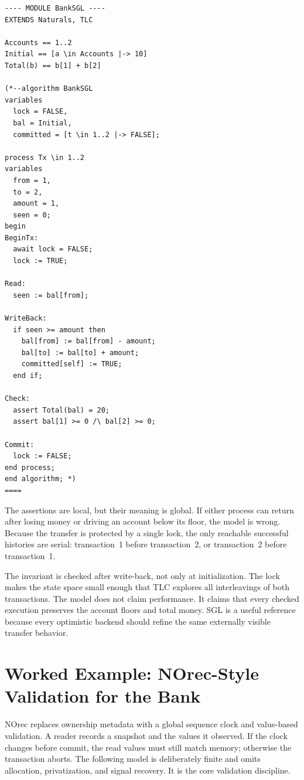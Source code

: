 \begin{lstlisting}[caption={A complete PlusCal model of the bank transfer under SGL.}]
---- MODULE BankSGL ----
EXTENDS Naturals, TLC

Accounts == 1..2
Initial == [a \in Accounts |-> 10]
Total(b) == b[1] + b[2]

(*--algorithm BankSGL
variables
  lock = FALSE,
  bal = Initial,
  committed = [t \in 1..2 |-> FALSE];

process Tx \in 1..2
variables
  from = 1,
  to = 2,
  amount = 1,
  seen = 0;
begin
BeginTx:
  await lock = FALSE;
  lock := TRUE;

Read:
  seen := bal[from];

WriteBack:
  if seen >= amount then
    bal[from] := bal[from] - amount;
    bal[to] := bal[to] + amount;
    committed[self] := TRUE;
  end if;

Check:
  assert Total(bal) = 20;
  assert bal[1] >= 0 /\ bal[2] >= 0;

Commit:
  lock := FALSE;
end process;
end algorithm; *)
====
\end{lstlisting}

The assertions are local, but their meaning is global.  If either process can
return after losing money or driving an account below its floor, the model is
wrong.  Because the transfer is protected by a single lock, the only reachable
successful histories are serial: transaction~1 before transaction~2, or
transaction~2 before transaction~1.

The invariant is checked after write-back, not only at initialization.  The
lock makes the state space small enough that TLC explores all interleavings of
both transactions.  The model does not claim performance.  It claims that every
checked execution preserves the account floors and total money.  SGL is a
useful reference because every optimistic backend should refine the same
externally visible transfer behavior.

\section{Worked Example: NOrec-Style Validation for the Bank}

NOrec replaces ownership metadata with a global sequence clock and value-based
validation.  A reader records a snapshot and the values it observed.  If the
clock changes before commit, the read values must still match memory; otherwise
the transaction aborts.  The following model is deliberately finite and omits
allocation, privatization, and signal recovery.  It is the core validation
discipline.

